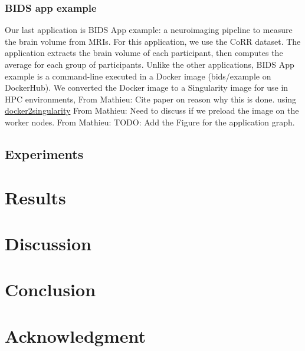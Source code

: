 \documentclass[conference]{IEEEtran}
\newcommand{\MD}[1]{\color{magenta}From Mathieu: #1 \color{black}}
\begin{document}
	
\subsubsection{BIDS app example}
Our last application is BIDS App example: a neuroimaging pipeline to measure the brain volume from MRIs.
For this application, we use the CoRR dataset.
The application extracts the brain volume of each participant, then computes the average for each group of participants.
Unlike the other applications, BIDS App example is a command-line executed in a Docker image (bids/example on DockerHub).
We converted the Docker image to a Singularity image for use in HPC environments, \MD{Cite paper on reason why this is done.}
using \href{https://hub.docker.com/r/singularityware/docker2singularity/tags/}{docker2singularity}
\MD{Need to discuss if we preload the image on the worker nodes.}
\MD{TODO: Add the Figure for the application graph.}
	
\subsection{Experiments} %
	
\section{Results} %
	
\section{Discussion} %
	
\section{Conclusion} %
	
\section*{Acknowledgment} %
	
	


	
\end{document}
